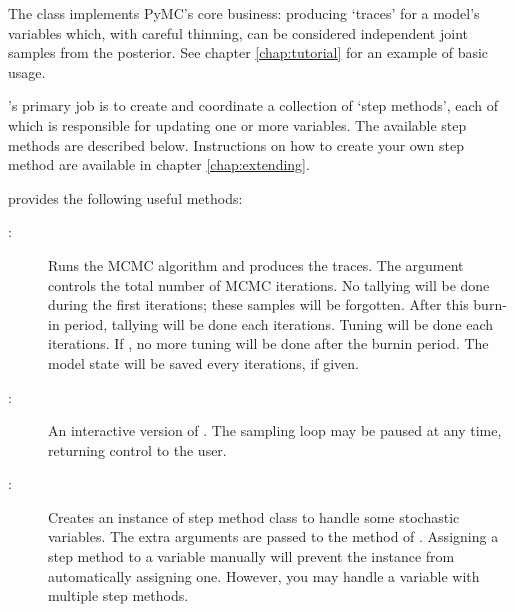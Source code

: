 The  class implements PyMC's core business: producing `traces' for a model's variables which, with careful thinning, can be considered independent joint samples from the posterior. See chapter \ref{chap:tutorial} for an example of basic usage.

's primary job is to create and coordinate a collection of `step methods', each of which is responsible for updating one or more variables. The available step methods are described below. Instructions on how to create your own step method are available in chapter \ref{chap:extending}.

 provides the following useful methods:
\begin{description}
    \item[:] Runs the MCMC algorithm and produces the traces. The  argument controls the total number of MCMC iterations. No tallying will be done during the first  iterations; these samples will be forgotten. After this burn-in period, tallying will be done each  iterations. Tuning will be done each  iterations. If , no more tuning will be done after the burnin period. The model state will be saved every  iterations, if given.  
    \item[:] An interactive version of . The sampling loop may be paused at any time, returning control to the user.
    \item[:] Creates an instance of step method class  to handle some stochastic variables. The extra arguments are passed to the  method of . Assigning a step method to a variable manually will prevent the  instance from automatically assigning one. However, you may handle a variable with multiple step methods.


\end{description}
